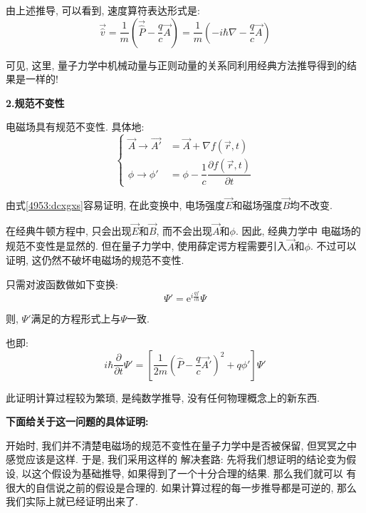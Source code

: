 \documentclass[a4paper, 11pt]{article}
\begin{document}
\begin{spacing}{1.2}
        由上述推导, 可以看到, 速度算符表达形式是:
        \begin{equation}
          \vec{\hat{v}} = \dfrac{1}{m}\left(\vec{\hat{P}}-\dfrac{q}{c}\vec{A}\right) 
                        = \dfrac{1}{m}\left(-i\hbar\nabla-\dfrac{q}{c}\vec{A}\right)    
        \end{equation}

        可见, 这里, 量子力学中机械动量与正则动量的关系同利用经典方法推导得到的结果是一样的!

        \textbf{2.规范不变性}

        电磁场具有规范不变性. 具体地:
        \begin{equation}
          \left\{\begin{aligned}
            \vec{A}\to\vec{A'} &= \vec{A}+\nabla{}f(\vec{r},t)\\
            \phi\to\phi'&=\phi-\dfrac{1}{c}\dfrac{\partial{}f(\vec{r},t)}{\partial{}t}
          \end{aligned}\right.
        \end{equation}

        由式\eqref{4953:dcxgxs}容易证明, 在此变换中, 电场强度$\vec{E}$和磁场强度$\vec{B}$均不改变.

        在经典牛顿方程中, 只会出现$\vec{E}$和$\vec{B}$, 而不会出现$\vec{A}$和$\phi$. 因此, 经典力学中
        电磁场的规范不变性是显然的. 但在量子力学中, 使用薛定谔方程需要引入$\vec{A}$和$\phi$. 不过可以证明, 
        这仍然不破坏电磁场的规范不变性. 
        
        只需对波函数做如下变换:
        \begin{equation}
          \Psi' = \mathrm{e}^{i\frac{qf}{c\hbar}}\Psi
        \end{equation}

        则, $\Psi'$满足的方程形式上与$\Psi$一致.

        也即:
        \begin{equation}
          \label{5084:ch}
          i\hbar\dfrac{\partial}{\partial{}t}\Psi'=
          \left[\dfrac{1}{2m}\left(\hat{P}-\dfrac{q}{c}\vec{A}'\right)^2+q\phi'\right]\Psi'
        \end{equation}

        此证明计算过程较为繁琐, 是纯数学推导, 没有任何物理概念上的新东西. 

        \textbf{下面给关于这一问题的具体证明:}

        开始时, 我们并不清楚电磁场的规范不变性在量子力学中是否被保留, 但冥冥之中感觉应该是这样. 于是, 我们采用这样的
        解决套路: 先将我们想证明的结论变为假设, 以这个假设为基础推导, 如果得到了一个十分合理的结果. 那么我们就可以
        有很大的自信说之前的假设是合理的. 如果计算过程的每一步推导都是可逆的, 那么我们实际上就已经证明出来了.


\end{spacing}
\end{document}
